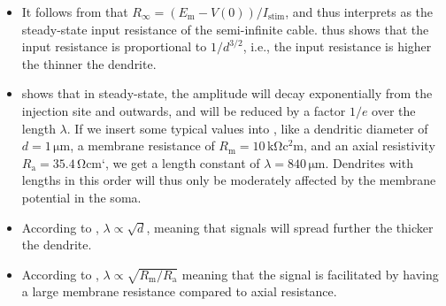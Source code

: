 \begin{itemize}

\item It follows from  that $R_{\infty} = (E_\text{m}-V(0))/I_\text{stim}$, and thus interprets as the steady-state input resistance of the semi-infinite cable.  thus shows that the input resistance is proportional to $1/d^{3/2}$, i.e., the input resistance is higher the thinner the dendrite. 

\item {} shows that in steady-state, the amplitude will decay exponentially from the injection site and outwards, and will be reduced by a factor $1/e$ over the length $\lambda$. If we insert some typical values into , like a dendritic diameter of $d=1 \, \si{\micro\metre}$, a membrane resistance of $R_\text{m}=10 \,
\si{\kilo\ohm\square\centi\metre}$, and an axial resistivity $R_\text{a}=35.4\, \si{\ohm\centi\metre}$`, we get a length constant of $\lambda = 840\, \si{\micro\metre}$. Dendrites with lengths in this order will thus only be moderately affected by the membrane potential in the soma.

\item According to , $\lambda \propto \sqrt{d}$, meaning that signals will spread further the thicker the dendrite.

\item According to , $\lambda \propto \sqrt{R_\text{m}/R_\text{a}}$ meaning that the signal is facilitated by having a large membrane resistance compared to axial resistance. 
\end{itemize}


